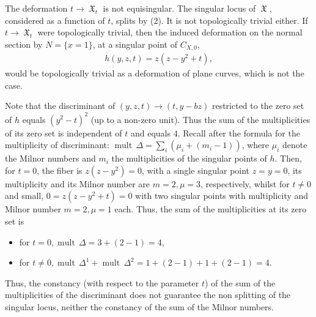 \documentclass[12pt]{amsart}
\theoremstyle{definition}
\numberwithin{equation}{section}
\DeclareMathOperator{\mult}{mult \,}
\DeclareMathOperator{\frakX}{\mathfrak {X}}
\begin{document}
 The deformation $t\to \frakX_t$ is not equisingular. The singular locus of $\frakX$, considered as a function of $t$, splits by (2).  It is not topologically trivial either. If $t\to \frakX_t$  were topologically trivial, then the induced deformation on the normal section by $N=\{x=1\}$,  at a singular point of $C_{X,0}$,
\begin{align}\label{eq:deformsliced}
h(y,z,t)=z( z-y^2+t) ,
\end{align} 
would be topologically trivial as a deformation of plane curves, which is not the case.  

Note that the discriminant of $(y,z,t)\to (t, y-bz) $ restricted to the zero set of $h$ equals 
 $(y^2-t)^2$ (up to a non-zero unit). Thus the sum of the multiplicities of its zero set is
independent of $t$ and equals $4$.  Recall after \cite[Chap. II, Prop 1.2]{Te76} the  formula for the multiplicity of discriminant:  $\mult \Delta = \sum_i (\mu_i+(m_i-1))$, where $\mu_i$ denote the Milnor numbers and $m_i$ the multiplicities 
of the singular points of $h$.  Then, for $t=0$, the fiber is $z(z-y^2)=0$, with a single singular point $z=y=0$, its multiplicity and its Milnor number are  $ m=2, \mu =3$, respectively, whilst for $t\ne 0$ and small, $0=z(z-y^2+t)=0$  with two singular points with multiplicity and  Milnor number $m=2, \mu=1$ each. 
 Thus, the sum of the multiplicities  at its zero set is
\begin{itemize}
  \item
for $t=0, \mult \Delta = 3+(2-1)=4$, 
\item
for $t\ne 0, \mult\Delta ^1+ \mult\Delta^2=1+(2-1)+1+(2-1)=4$.
\end{itemize}
Thus, the constancy (with respect to the parameter $t$)  of the sum of the multiplicities of the discriminant does not guarantee the non  splitting of the singular locus, neither the constancy of the sum of the Milnor numbers. 
\newpage
\end{document}
